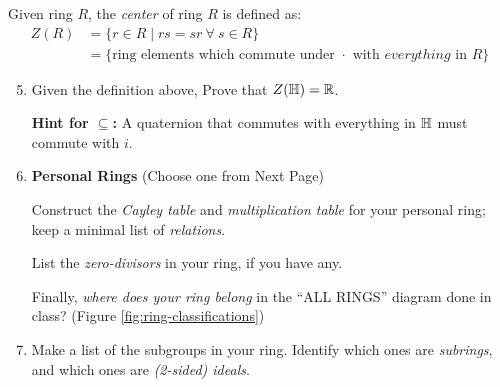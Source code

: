 \begin{definition}   
    Given ring $R$, the \textit{center} of ring $R$ is defined as:
    \begin{align*}
        Z(R) &= \{ r \in R \mid rs = sr \ \forall \ s \in R \} \\
        &= \text{\{ring elements which commute under } \cdot \text{ with }everything \text{ in } R \}
    \end{align*}
\end{definition}
\begin{enumerate}
    \setcounter{enumi}{4}
    \item Given the definition above, Prove that \( Z({\mathbb{ H}}) = \mathbb{R} \).  \\ \steezybreak

    \textbf{Hint for \( \subseteq \):} A quaternion that commutes with everything in \( {\mathbb{ H}} \) must commute with \( i \).  \\ \steezybreak
\end{enumerate}

\begin{enumerate}
    \setcounter{enumi}{5} %

    \item \textbf{Personal Rings} (Choose one from Next Page) 

    Construct the \textit{Cayley table} and \textit{multiplication table} for your personal ring;  
    keep a minimal list of \textit{relations}.  \\ \steezybreak

    List the \textit{zero-divisors} in your ring, if you have any.  \\ \steezybreak

    Finally, \textit{where does your ring belong} in the ``ALL RINGS'' diagram done in class? (Figure \ref{fig:ring-classifications}) \\ \steezybreak


    \item Make a list of the subgroups in your ring.  
    Identify which ones are \textit{subrings}, and which ones are \textit{(2-sided) ideals}.
\end{enumerate}
\newpage
